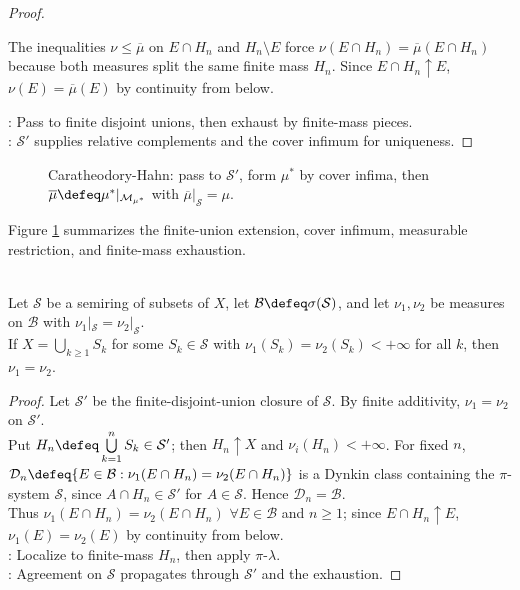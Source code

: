 \begin{theorem}
\begin{proof}
\begin{enumerate}[label=(\roman*)]
The inequalities $\nu\leq\overline{\mu}$ on $E\cap H_n$ and $H_n\setminus E$ force $\nu(E\cap H_n)=\overline{\mu}(E\cap H_n)$ because both measures split the same finite mass $H_n$. Since $E\cap H_n\uparrow E$, $\nu(E)=\overline{\mu}(E)$ by continuity from below.
\end{enumerate}
: Pass to finite disjoint unions, then exhaust by finite-mass pieces.\\
: $\mathcal{S}'$ supplies relative complements and the cover infimum for uniqueness.
\end{proof}
\end{theorem}

\begin{figure}[H]
  \centering
  
  \caption{Caratheodory-Hahn: pass to $\mathcal{S}'$, form $\mu^\ast$ by cover infima, then $\overline{\mu}\defeq\mu^\ast|_{\mathcal{M}_{\mu^\ast}}$ with $\overline{\mu}|_{\mathcal{S}}=\mu$.}
  \label{fig:caratheodory-hahn-extension-flow}
\end{figure}

Figure \ref{fig:caratheodory-hahn-extension-flow} summarizes the finite-union extension, cover infimum, measurable restriction, and finite-mass exhaustion.

\begin{corollary} \label{cor:sigma-finite-measures-agree-on-semiring} \\
Let $\mathcal{S}$ be a semiring of subsets of $X$, let $\mathcal{B}\defeq\sigma(\mathcal{S})$, and let $\nu_1,\nu_2$ be measures on $\mathcal{B}$ with $\nu_1|_{\mathcal{S}}=\nu_2|_{\mathcal{S}}$.\\
If $X=\bigcup\limits_{k\geq1}S_k$ for some $S_k\in\mathcal{S}$ with $\nu_1(S_k)=\nu_2(S_k)<+\infty$ for all $k$, then $\nu_1=\nu_2$.
\begin{proof} Let $\mathcal{S}'$ be the finite-disjoint-union closure of $\mathcal{S}$. By finite additivity, $\nu_1=\nu_2$ on $\mathcal{S}'$.\\
Put $H_n\defeq\bigcup\limits_{k=1}^{n}S_k\in\mathcal{S}'$; then $H_n\uparrow X$ and $\nu_i(H_n)<+\infty$. For fixed $n$, $\mathcal{D}_n\defeq\{E\in\mathcal{B}:\nu_1(E\cap H_n)=\nu_2(E\cap H_n)\}$ is a Dynkin class containing the $\pi$-system $\mathcal{S}$, since $A\cap H_n\in\mathcal{S}'$ for $A\in\mathcal{S}$. Hence $\mathcal{D}_n=\mathcal{B}$.\\
Thus $\nu_1(E\cap H_n)=\nu_2(E\cap H_n)$ $\forall E\in\mathcal{B}$ and $n\geq1$; since $E\cap H_n\uparrow E$, $\nu_1(E)=\nu_2(E)$ by continuity from below.\\
: Localize to finite-mass $H_n$, then apply $\pi$-$\lambda$.\\
: Agreement on $\mathcal{S}$ propagates through $\mathcal{S}'$ and the exhaustion.
\end{proof}
\end{corollary}
